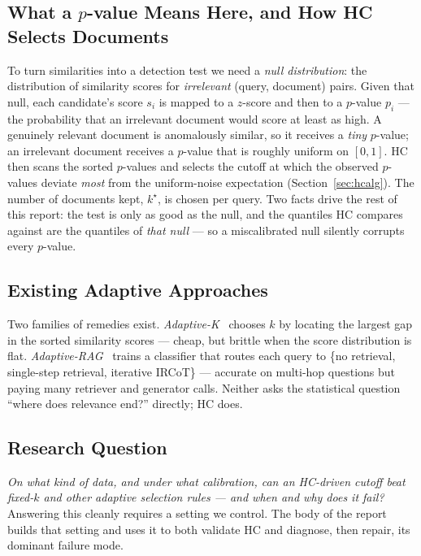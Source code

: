 \documentclass[letterpaper]{article}
\begin{document}
\subsection{What a $p$-value Means Here, and How HC Selects Documents}
To turn similarities into a detection test we need a \emph{null
distribution}: the distribution of similarity scores for
\emph{irrelevant} (query, document) pairs. Given that null, each
candidate's score $s_i$ is mapped to a $z$-score and then to a
$p$-value $p_i$ --- the probability that an irrelevant document would
score at least as high. A genuinely relevant document is anomalously
similar, so it receives a \emph{tiny} $p$-value; an irrelevant document
receives a $p$-value that is roughly uniform on $[0,1]$. HC then scans
the sorted $p$-values and selects the cutoff at which the observed
$p$-values deviate \emph{most} from the uniform-noise expectation
(Section~\ref{sec:hcalg}). The number of documents kept, $k^\star$, is
chosen per query. Two facts drive the rest of this report: the test is
only as good as the null, and the quantiles HC compares against are the
quantiles of \emph{that null} --- so a miscalibrated null silently
corrupts every $p$-value.

\subsection{Existing Adaptive Approaches}
Two families of remedies exist. \emph{Adaptive-K}~\cite{adaptivek2025}
chooses $k$ by locating the largest gap in the sorted similarity
scores --- cheap, but brittle when the score distribution is flat.
\emph{Adaptive-RAG}~\cite{jeong2024adaptiverag} trains a classifier
that routes each query to \{no retrieval, single-step retrieval,
iterative IRCoT\} --- accurate on multi-hop questions but paying many
retriever and generator calls. Neither asks the statistical question
``where does relevance end?'' directly; HC does.

\subsection{Research Question}
\emph{On what kind of data, and under what calibration, can an
HC-driven cutoff beat fixed-$k$ and other adaptive selection rules ---
and when and why does it fail?} Answering this cleanly requires a
setting we control. The body of the report builds that setting and
uses it to both validate HC and diagnose, then repair, its dominant
failure mode.

\end{document}
